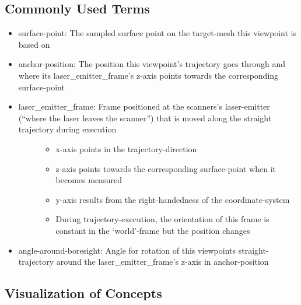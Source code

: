 \documentclass[letterpaper,10pt,english]{sphinxmanual}
\begin{document}
\subsection{Commonly Used Terms}
\label{\detokenize{module_view:commonly-used-terms}}\begin{itemize}
\item {} 
surface-point: The sampled surface point on the target-mesh this viewpoint is based on

\item {} 
anchor-position: The position this viewpoint’s trajectory goes through and where its laser\_emitter\_frame’s z-axis points towards the corresponding surface-point

\item {} \begin{description}
\item[{laser\_emitter\_frame: Frame positioned at the scanners’s laser-emitter (“where the laser leaves the scanner”) that is moved along the straight trajectory during execution}] \leavevmode\begin{itemize}
\item {} 
x-axis points in the trajectory-direction

\item {} 
z-axis points towards the corresponding surface-point when it becomes measured

\item {} 
y-axis results from the right-handedness of the coordinate-system

\item {} 
During trajectory-execution, the orientation of this frame is constant in the ‘world’-frame but the position changes

\end{itemize}

\end{description}

\item {} 
angle-around-boresight: Angle for rotation of this viewpoints straight-trajectory around the laser\_emitter\_frame’s z-axis in anchor-position

\end{itemize}


\subsection{Visualization of Concepts}
\label{\detokenize{module_view:visualization-of-concepts}}
\begin{figure}[htbp]
\centering

\noindent{}
\end{figure}
\end{document}

